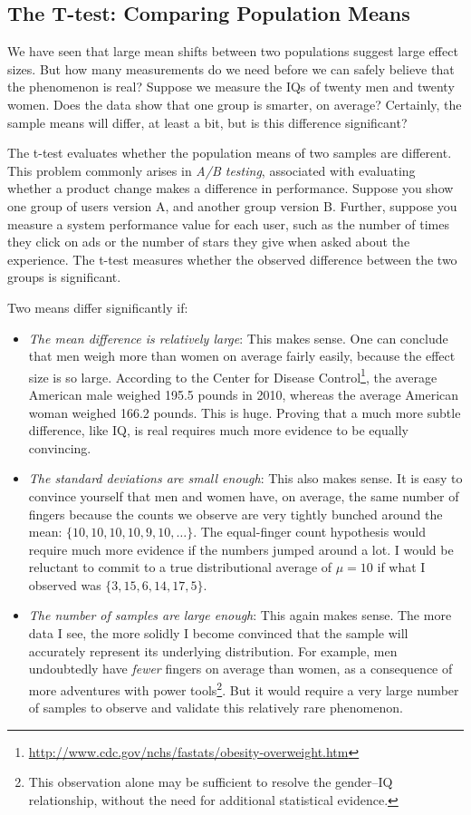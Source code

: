 \documentclass[10pt]{article}
\begin{document}
\subsection{The T-test: Comparing Population Means}
We have seen that large mean shifts between two populations suggest large effect sizes. But how many measurements do we need before we can safely believe that the phenomenon is real? Suppose we measure the IQs of twenty men and twenty women. Does the data show that one group is smarter, on average? Certainly, the sample means will differ, at least a bit, but is this difference significant?

The t-test evaluates whether the population means of two samples are different. This problem commonly arises in \textit{A/B testing}, associated with evaluating whether a product change makes a difference in performance. Suppose you show one group of users version A, and another group version B. Further, suppose you measure a system performance value for each user, such as the number of times they click on ads or the number of stars they give when asked about the experience. The t-test measures whether the observed difference between the two groups is significant.

Two means differ significantly if:

\begin{itemize}
    \item \textit{The mean difference is relatively large}: This makes sense. One can conclude that men weigh more than women on average fairly easily, because the effect size is so large. According to the Center for Disease Control\footnote{\url{http://www.cdc.gov/nchs/fastats/obesity-overweight.htm}}, the average American male weighed 195.5 pounds in 2010, whereas the average American woman weighed 166.2 pounds. This is huge. Proving that a much more subtle difference, like IQ, is real requires much more evidence to be equally convincing.
    \item \textit{The standard deviations are small enough}: This also makes sense. It is easy to convince yourself that men and women have, on average, the same number of fingers because the counts we observe are very tightly bunched around the mean: $\{10, 10, 10, 10, 9, 10, \ldots\}$. The equal-finger count hypothesis would require much more evidence if the numbers jumped around a lot. I would be reluctant to commit to a true distributional average of $\mu=10$ if what I observed was $\{3, 15, 6, 14, 17, 5\}$.
    \item \textit{The number of samples are large enough}: This again makes sense. The more data I see, the more solidly I become convinced that the sample will accurately represent its underlying distribution. For example, men undoubtedly have \textit{fewer} fingers on average than women, as a consequence of more adventures with power tools\footnote{This observation alone may be sufficient to resolve the gender–IQ relationship, without the need for additional statistical evidence.}. But it would require a very large number of samples to observe and validate this relatively rare phenomenon.
\end{itemize}
\end{document}

